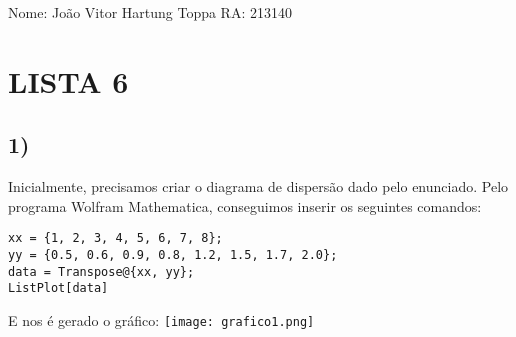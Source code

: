 \documentclass{article}
\begin{document}
\noindent Nome: João Vitor Hartung Toppa\hfill\break
\noindent RA: 213140
\section*{\centering LISTA 6}
\subsection*{1)}
\noindent Inicialmente, precisamos criar o diagrama de dispersão dado pelo enunciado. Pelo programa Wolfram Mathematica,
conseguimos inserir os seguintes comandos:
\hfill\break
\begin{verbatim}
xx = {1, 2, 3, 4, 5, 6, 7, 8};
yy = {0.5, 0.6, 0.9, 0.8, 1.2, 1.5, 1.7, 2.0};
data = Transpose@{xx, yy};
ListPlot[data]
\end{verbatim} 
E nos é gerado o gráfico:
\hfill\break
\hfill\break
\texttt{[image: grafico1.png]} %
\end{document}

